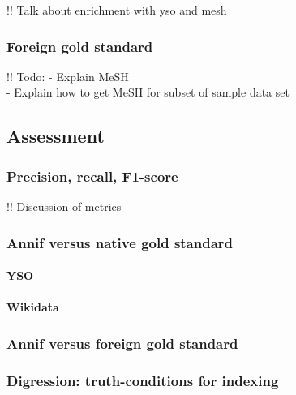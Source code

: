 !! Talk about enrichment with yso and mesh

\hypertarget{foreign-gold-standard}{%
\subsubsection{Foreign gold standard}\label{foreign-gold-standard}}

!! Todo: - Explain MeSH\\
- Explain how to get MeSH for subset of sample data set

\hypertarget{assessment}{%
\subsection{Assessment}\label{assessment}}

\hypertarget{precision-recall-f1-score}{%
\subsubsection{Precision, recall,
F1-score}\label{precision-recall-f1-score}}

!! Discussion of metrics

\hypertarget{annif-versus-native-gold-standard}{%
\subsubsection{Annif versus native gold
standard}\label{annif-versus-native-gold-standard}}

\hypertarget{yso}{%
\paragraph{YSO}\label{yso}}

\hypertarget{wikidata}{%
\paragraph{Wikidata}\label{wikidata}}

\hypertarget{annif-versus-foreign-gold-standard}{%
\subsubsection{Annif versus foreign gold
standard}\label{annif-versus-foreign-gold-standard}}

\hypertarget{digression-truth-conditions-for-indexing}{%
\subsubsection{Digression: truth-conditions for
indexing}\label{digression-truth-conditions-for-indexing}}


